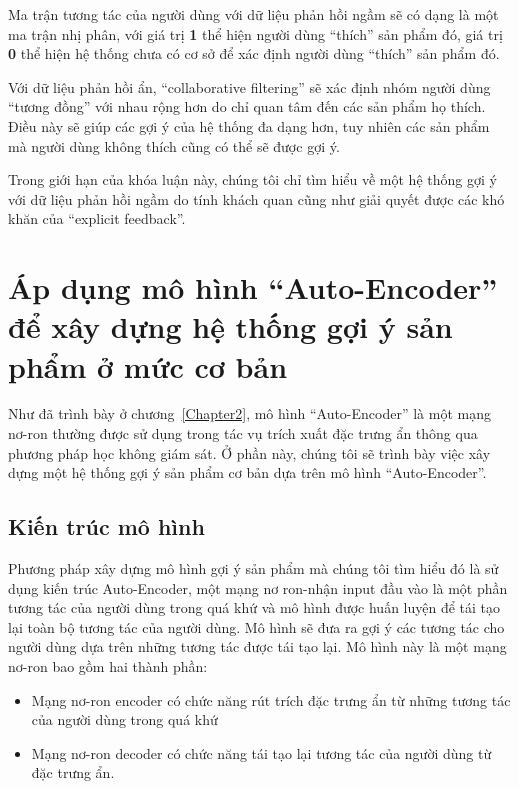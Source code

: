    Ma trận tương tác của người dùng với dữ liệu phản hồi ngầm sẽ có dạng là một ma trận nhị phân, với giá trị \textbf{1} 
    thể hiện người dùng ``thích'' sản phẩm đó, giá trị \textbf{0} thể hiện hệ thống chưa có cơ sở để xác định người dùng ``thích'' sản phẩm đó.

    Với dữ liệu phản hồi ẩn, ``collaborative filtering'' sẽ xác định nhóm người dùng ``tương đồng'' với nhau rộng hơn
    do chỉ quan tâm đến các sản phẩm họ thích. Điều này sẽ giúp các gợi ý của hệ thống 
    đa dạng hơn, tuy nhiên các sản phẩm mà người dùng không thích cũng có thể sẽ được gợi ý.

    Trong giới hạn của khóa luận này, chúng tôi chỉ tìm hiểu về một hệ thống gợi ý với dữ liệu phản hồi ngầm do tính khách quan
    cũng như giải quyết được các khó khăn của ``explicit feedback''.

\section{Áp dụng mô hình ``Auto-Encoder'' để xây dựng hệ thống gợi ý sản phẩm ở mức cơ bản}
    Như đã trình bày ở chương~\ref{Chapter2}, mô hình ``Auto-Encoder'' là một mạng nơ-ron thường được sử dụng trong tác vụ trích xuất đặc trưng ẩn thông qua phương pháp học không giám sát.
    Ở phần này, chúng tôi sẽ trình bày việc xây dựng một hệ thống gợi ý sản phẩm cơ bản dựa trên mô hình ``Auto-Encoder''.

    \subsection{Kiến trúc mô hình}
    \label{chap3/sec11}
    Phương pháp xây dựng mô hình gợi ý sản phẩm mà chúng tôi tìm hiểu đó là sử dụng kiến trúc Auto-Encoder, một mạng nơ ron-nhận input đầu vào là một phần tương tác của người dùng trong quá khứ và mô hình được huấn luyện để tái tạo lại toàn bộ tương tác của người dùng. 
    Mô hình sẽ đưa ra gợi ý các tương tác cho người dùng dựa trên những tương tác được tái tạo lại.
    Mô hình này là một mạng nơ-ron bao gồm hai thành phần:
    \begin{itemize}
        \item Mạng nơ-ron encoder có chức năng rút trích đặc trưng ẩn từ những tương tác của người dùng trong quá khứ
        \item Mạng nơ-ron decoder có chức năng tái tạo lại tương tác của người dùng từ đặc trưng ẩn.
    \end{itemize}

